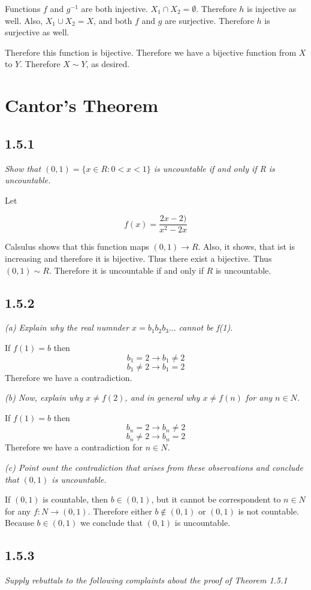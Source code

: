 \documentclass[11pt,oneside,titlepage]{book}
\begin{document}
Functions $f$ and $g^{-1}$ are both injective.  $X_1 \cap X_2 = \emptyset$. Therefore
$h$ is injective as well.
Also, $X_1 \cup X_2 = X$,  and both $f$ and $g$ are surjective. Therefore $h$ is surjective
as well.

Therefore this function is bijective. Therefore we have a bijective function from
$X$ to $Y$. Therefore $X \sim Y$, as desired.

\section{Cantor's Theorem}
    
\subsection*{1.5.1}
\textit{Show that $(0, 1) = \{x \in R: 0 < x < 1\}$ is uncountable if and only if R
  is uncountable.}

Let

$$ f(x) = \frac{2x - 2)}{x ^ 2 - 2x}$$

Calsulus shows that this function maps $(0, 1) \to R$. Also, it shows,
that ist is increasing and therefore it is bijective. Thus
there exist a bijective. Thus $(0, 1) \sim R$. Therefore it is uncountable
if and only if $R$ is uncountable.

\subsection*{1.5.2}
\textit{(a) Explain why the real numnder $x = b_1 b_2 b_3...$ cannot be f(1).}

If $f(1) = b$ then
$$b_1 = 2 \to b_1 \neq 2$$
$$b_1 \neq 2 \to b_1 = 2$$
Therefore we have a contradiction.

\textit{(b) Now, explain why $x \neq f(2)$, and in general why $x \neq f(n)$ for any
  $n \in N$. }

If $f(1) = b$ then
$$b_n = 2 \to b_n \neq 2$$
$$b_n \neq 2 \to b_n = 2$$
Therefore we have a contradiction for $n \in N$.

\textit{(c) Point ount the contradiction that arises from these observations and
  conclude that $(0, 1)$ is uncountable.}

If $(0,1)$ is countable, then $b \in (0, 1)$, but it cannot be correspondent
to $n \in N$ for any $f: N \to (0, 1)$. Therefore either $b \notin (0, 1)$ or
$(0, 1)$ is not countable. Because $b \in (0, 1)$ we conclude that $(0, 1)$ is
uncountable.

\subsection*{1.5.3}
\textit{Supply rebuttals to the following complaints about the proof of
  Theorem 1.5.1}
\end{document}
